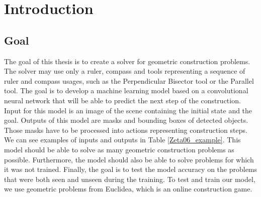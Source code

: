 \chapter{Introduction}
\section{Goal}
The goal of this thesis is to create a solver for geometric construction problems. The solver may use only a ruler, compass and tools representing a sequence of ruler and compass usages, such as the Perpendicular Bisector tool or the Parallel tool. The goal is to develop a machine learning model based on a convolutional neural network that will be able to predict the next step of the construction. Input for this model is an image of the scene containing the initial state and the goal. Outputs of this model are masks and bounding boxes of detected objects. Those masks have to be processed into actions representing construction steps. We can see examples of inputs and outputs in Table \ref{Zeta06_example}. This model should be able to solve as many geometric construction problems as possible. Furthermore, the model should also be able to solve problems for which it was not trained. Finally, the goal is to test the model accuracy on the problems that were both seen and unseen during the training. To test and train our model, we use geometric problems from Euclidea, which is an online construction game.

